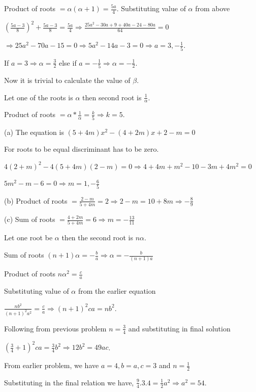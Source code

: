   Product of roots $= \alpha(\alpha + 1) = \frac{5a}{4}$. Substituting value of $\alpha$ from above

  $\left(\frac{5a - 3}{8}\right)^2 + \frac{5a - 3}{8} = \frac{5a}{4}\Rightarrow \frac{25a^2 - 30a + 9 + 40a
    - 24 - 80a}{64} = 0$

  $\Rightarrow 25a^2 - 70a - 15 = 0 \Rightarrow 5a^2 - 14a - 3 = 0\Rightarrow a = 3, -\frac{1}{5}$.

  If $a = 3 \Rightarrow \alpha = \frac{3}{2}$ else if $a = -\frac{1}{5} \Rightarrow \alpha = -\frac{1}{2}$.

  Now it is trivial to calculate the value of $\beta$.
\item Let one of the roots is $\alpha$ then second root is $\frac{1}{\alpha}$.

  Product of roots $= \alpha * \frac{1}{\alpha} = \frac{k}{5} \Rightarrow k = 5$.
\item (a) The equation is $(5 + 4m)x^2 - (4 + 2m)x + 2 - m = 0$

  For roots to be equal discriminant has to be zero.

  $4(2 + m)^2 - 4(5 + 4m)(2 - m) = 0\Rightarrow 4 + 4m + m^2 - 10 - 3m + 4m^2 = 0$

  $5m^2 - m - 6 = 0 \Rightarrow m = 1, -\frac{6}{5}$

  (b) Product of roots $= \frac{2 - m}{5 + 4m} = 2 \Rightarrow 2 - m = 10 + 8m \Rightarrow -\frac{8}{9}$

  (c) Sum of roots $= \frac{4 + 2m}{5 + 4m} = 6 \Rightarrow m = -\frac{13}{11}$
\item Let one root be $\alpha$ then the second root is $n\alpha$.

  Sum of roots $(n + 1)\alpha = -\frac{b}{a} \Rightarrow \alpha = -\frac{b}{(n + 1)a}$

  Product of roots $n\alpha^2 = \frac{c}{a}$

  Substituting value of $\alpha$ from the earlier equation

  $\frac{nb^2}{(n + 1)^2a^2} = \frac{c}{a} \Rightarrow (n + 1)^2 ca = nb^2$.
\item Following from previous problem $n = \frac{3}{4}$ and substituting in final solution

  $\left(\frac{3}{4} + 1\right)^2ca = \frac{3}{4}b^2 \Rightarrow 12b^2 = 49ac$.
\item From earlier problem, we have $a = 4, b = a, c = 3$ and $n = \frac{1}{2}$

  Substituting in the final relation we have, $\frac{9}{4}.3.4 = \frac{1}{2}a^2\Rightarrow a^2 = 54$.

